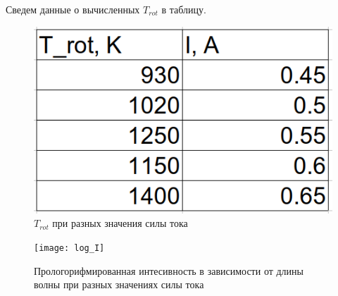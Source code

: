 \documentclass[a4paper,12pt]{article}
\begin{document}
\vspace{3cm}
     Сведем данные о вычисленных $T_{rot}$ в таблицу.
	\begin{figure}[H]
		\begin{center}
			\includegraphics[scale=0.4]{rot_I}
			\caption{$T_{rot}$ при разных значения силы тока}
		\end{center}
	\end{figure}
	
\newpage    
	\begin{figure}[H]
		\begin{center}
			\texttt{[image: log\_I]}
			\caption{Прологорифмированная интесивность в зависимости от длины волны при разных значениях силы тока}
		\end{center}
	\end{figure}
	
\end{document}
